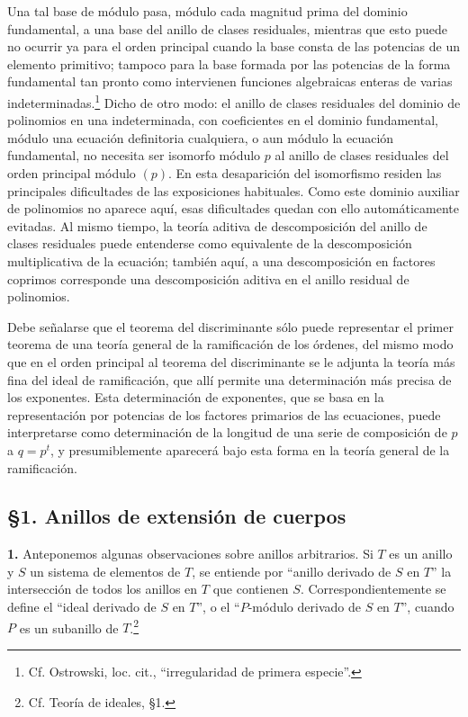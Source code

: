 \documentclass[11pt]{article}
\begin{document}
Una tal base de módulo pasa, módulo cada magnitud prima del dominio fundamental, a una base del anillo de clases residuales, mientras que esto puede no ocurrir ya para el orden principal cuando la base consta de las potencias de un elemento primitivo; tampoco para la base formada por las potencias de la forma fundamental tan pronto como intervienen funciones algebraicas enteras de varias indeterminadas.\footnote{Cf. Ostrowski, loc. cit., ``irregularidad de primera especie''.} Dicho de otro modo: el anillo de clases residuales del dominio de polinomios en una indeterminada, con coeficientes en el dominio fundamental, módulo una ecuación definitoria cualquiera, o aun módulo la ecuación fundamental, no necesita ser isomorfo módulo $p$ al anillo de clases residuales del orden principal módulo $(p)$. En esta desaparición del isomorfismo residen las principales dificultades de las exposiciones habituales. Como este dominio auxiliar de polinomios no aparece aquí, esas dificultades quedan con ello automáticamente evitadas. Al mismo tiempo, la teoría aditiva de descomposición del anillo de clases residuales puede entenderse como equivalente de la descomposición multiplicativa de la ecuación; también aquí, a una descomposición en factores coprimos corresponde una descomposición aditiva en el anillo residual de polinomios.

Debe señalarse que el teorema del discriminante sólo puede representar el primer teorema de una teoría general de la ramificación de los órdenes, del mismo modo que en el orden principal al teorema del discriminante se le adjunta la teoría más fina del ideal de ramificación, que allí permite una determinación más precisa de los exponentes. Esta determinación de exponentes, que se basa en la representación por potencias de los factores primarios de las ecuaciones, puede interpretarse como determinación de la longitud de una serie de composición de $p$ a $q=p^t$, y presumiblemente aparecerá bajo esta forma en la teoría general de la ramificación.

\subsection*{\S 1. Anillos de extensión de cuerpos}

\textbf{1.} Anteponemos algunas observaciones sobre anillos arbitrarios. Si $T$ es un anillo y $S$ un sistema de elementos de $T$, se entiende por ``anillo derivado de $S$ en $T$'' la intersección de todos los anillos en $T$ que contienen $S$. Correspondientemente se define el ``ideal derivado de $S$ en $T$'', o el ``$P$-módulo derivado de $S$ en $T$'', cuando $P$ es un subanillo de $T$.\footnote{Cf. Teoría de ideales, \S 1.}
\end{document}
